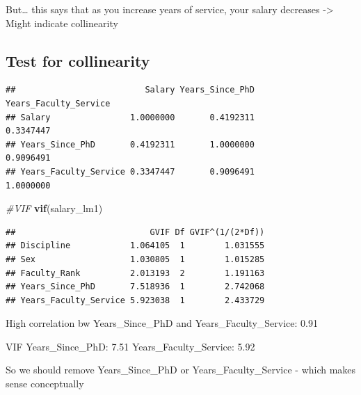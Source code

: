 \documentclass[]{article}
\newenvironment{Shaded}{\begin{snugshade}}{\end{snugshade}}
\newcommand{\KeywordTok}[1]{\textcolor[rgb]{0.13,0.29,0.53}{\textbf{#1}}}
\newcommand{\StringTok}[1]{\textcolor[rgb]{0.31,0.60,0.02}{#1}}
\newcommand{\CommentTok}[1]{\textcolor[rgb]{0.56,0.35,0.01}{\textit{#1}}}
\newcommand{\OperatorTok}[1]{\textcolor[rgb]{0.81,0.36,0.00}{\textbf{#1}}}
\newcommand{\NormalTok}[1]{#1}
\begin{document}
But\ldots{} this says that as you increase years of service, your salary
decreases -\textgreater{} Might indicate collinearity

\subsection{Test for collinearity}\label{test-for-collinearity}

\begin{Shaded}
\end{Shaded}

\begin{verbatim}
##                          Salary Years_Since_PhD Years_Faculty_Service
## Salary                1.0000000       0.4192311             0.3347447
## Years_Since_PhD       0.4192311       1.0000000             0.9096491
## Years_Faculty_Service 0.3347447       0.9096491             1.0000000
\end{verbatim}

\begin{Shaded}
\begin{Highlighting}[]
\CommentTok{#VIF}
\KeywordTok{vif}\NormalTok{(salary_lm1)}
\end{Highlighting}
\end{Shaded}

\begin{verbatim}
##                           GVIF Df GVIF^(1/(2*Df))
## Discipline            1.064105  1        1.031555
## Sex                   1.030805  1        1.015285
## Faculty_Rank          2.013193  2        1.191163
## Years_Since_PhD       7.518936  1        2.742068
## Years_Faculty_Service 5.923038  1        2.433729
\end{verbatim}

High correlation bw Years\_Since\_PhD and Years\_Faculty\_Service: 0.91

VIF Years\_Since\_PhD: 7.51 Years\_Faculty\_Service: 5.92

So we should remove Years\_Since\_PhD or Years\_Faculty\_Service - which
makes sense conceptually
\end{document}

